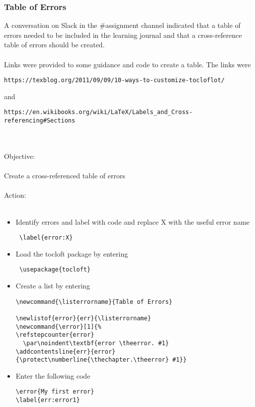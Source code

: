 \documentclass{article}
\newcommand{\listerrorname}{Table of Useful Errors}
\newcommand{\error}[1]{%
\refstepcounter{error}
  \par\noindent\textbf{error \theerror. #1}
\addcontentsline{err}{error}
{\protect\numberline{\thechapter.\theerror} #1}}
\begin{document}
\subsubsection*{Table of Errors}
A conversation on Slack in the \#assignment channel indicated that a table of errors needed to be included in the learning journal and that a cross-reference table of errors should be created.\\\\
Links were provided to some guidance and code to create a table. The links were \begin{verbatim}
https://texblog.org/2011/09/09/10-ways-to-customize-tocloflot/\end{verbatim} and \begin{verbatim}https://en.wikibooks.org/wiki/LaTeX/Labels_and_Cross-referencing#Sections\end{verbatim}\\\\
Objective:\\\\
Create a cross-referenced table of errors\\\\
Action:\\\\
\begin{itemize}
    \item Identify errors and label with code and replace X with the useful error name \begin{verbatim} \label{error:X}    \end{verbatim} 
    \item Load the tocloft package by entering \begin{verbatim} \usepackage{tocloft}\end{verbatim} 
    \item Create a list by entering \begin{verbatim}\newcommand{\listerrorname}{Table of Errors}

\newlistof{error}{err}{\listerrorname}
\newcommand{\error}[1]{%
\refstepcounter{error}
  \par\noindent\textbf{error \theerror. #1}
\addcontentsline{err}{error}
{\protect\numberline{\thechapter.\theerror} #1}}\end{verbatim} 
\item Enter the following code \begin{verbatim}
\error{My first error}
\label{err:error1}
\end{verbatim} 
\end{itemize}
\end{document}
